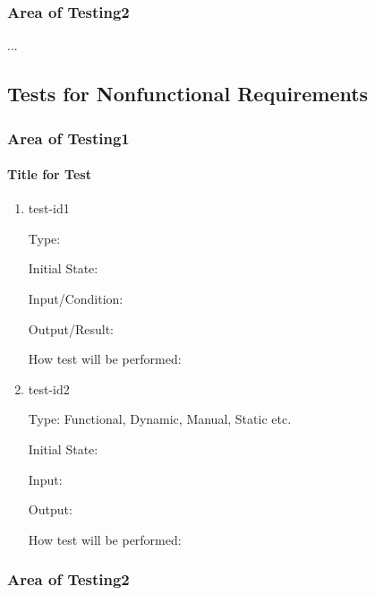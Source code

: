 \documentclass[12pt, titlepage]{article}
\begin{document}
\subsubsection{Area of Testing2}

...

\subsection{Tests for Nonfunctional Requirements}



\subsubsection{Area of Testing1}
		
\paragraph{Title for Test}

\begin{enumerate}

\item{test-id1\\}

Type: 
					
Initial State: 
					
Input/Condition: 
					
Output/Result: 
					
How test will be performed: 
					
\item{test-id2\\}

Type: Functional, Dynamic, Manual, Static etc.
					
Initial State: 
					
Input: 
					
Output: 
					
How test will be performed: 

\end{enumerate}

\subsubsection{Area of Testing2}
\end{document}

